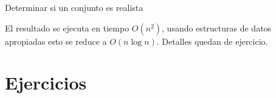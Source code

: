   \begin{algorithm}
    \DontPrintSemicolon\Indp

    \caption{Determinar si un conjunto es realista}
    \label{alg:realistic-subset}
  \end{algorithm}
  El resultado se ejecuta en tiempo \(O(n^2)\),
  usando estructuras de datos apropiadas esto se reduce a \(O(n \log n)\).
  Detalles quedan de ejercicio.


\section*{Ejercicios}
\label{sec:ejercicios-matroides}

